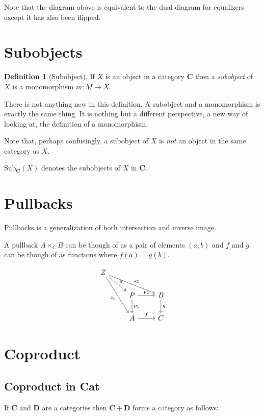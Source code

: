 \documentclass{book}
\theoremstyle{definition}
\newtheorem{definition}{Definition}[section]
\begin{document}
Note that the diagram above is equivalent to the dual diagram for equalizers
except it has also been flipped.

\section{Subobjects}

\begin{definition}[Subobject]
  If $X$ is an object in a category \textbf{C} then a \emph{subobject} of $X$ is
  a monomorphism $m : M \to X$.
\end{definition}

There is not anything new in this definition. A subobject and a monomorphism is
exactly the same thing. It is nothing but a different perspective, a new way of
looking at, the definition of a monomorphism.

Note that, perhaps confusingly, a subobject of $X$ is \emph{not} an object in
the same category as $X$.

$\text{Sub}_{\mathbf{C}}(X)$ denotes the subobjects of $X$ in \textbf{C}.

\section{Pullbacks}

Pullbacks is a generalization of both intersection and inverse
image. %

A pullback $A \times_{C} B$ can be though of as a pair of elements $(a, b)$ and
$f$ and $g$ can be though of as functions where $f(a) = g(b)$.

\[
  \begin{tikzcd}
    Z \ar[dr, dashed, "u"] \ar[drr, "z_{2}"] \ar[ddr, "z_{1}"'] & & \\
    & P \ar[r, "p_{2}"] \ar[d, "p_{1}"] & B \ar[d, "g"] \\
    & A \ar[r, "f"] & C
  \end{tikzcd}
\]

\section{Coproduct}

\subsection{Coproduct in \textbf{Cat}}

If \textbf{C} and \textbf{D} are a categories then $\mathbf{C} + \mathbf{D}$
forms a category as follows:
\end{document}
